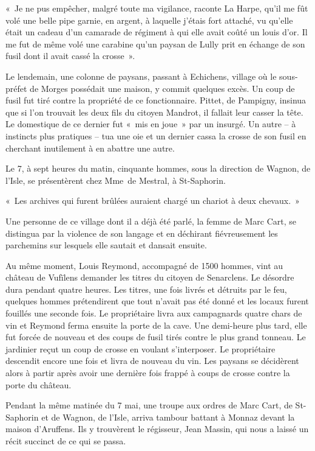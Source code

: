\documentclass[french,twoside]{book} %
\newenvironment{quoteblock}%
  {\begin{quoting}}
  {\end{quoting}}
\newenvironment{quotebar}{%
    \def\FrameCommand{{\color{rubric!10!}\vrule width 0.5em} \hspace{0.9em}}%
    \def\OuterFrameSep{\itemsep} %
    \MakeFramed {\advance\hsize-\width \FrameRestore}
  }%
  {%
    \endMakeFramed
  }
\renewenvironment{quoteblock}%
  {%
    \savenotes
    \setstretch{0.9}
    \normalfont
    \begin{quotebar}
  }
  {%
    \end{quotebar}
    \spewnotes
  }
\begin{document}
\begin{quoteblock}
 \noindent « Je ne pus empêcher, malgré toute ma vigilance, raconte La Harpe, qu’il me fût volé une belle pipe garnie, en argent, à laquelle j’étais fort attaché, vu qu’elle était un cadeau d’un camarade de régiment à qui elle avait coûté un louis d’or. Il me fut de même volé une carabine qu’un paysan de Lully prit en échange de son fusil dont il avait cassé la crosse ».
 \end{quoteblock}

\noindent Le lendemain, une colonne de paysans, passant à Echichens, village où le sous-préfet de Morges possédait une maison, y commit quelques excès. Un coup de fusil fut tiré contre la propriété de ce fonctionnaire. Pittet, de Pampigny, insinua que si l’on trouvait les deux fils du citoyen Mandrot, il fallait leur casser la tête. Le domestique de ce dernier fut « mis en joue » par un insurgé. Un autre – à instincts plus pratiques – tua une oie et un dernier cassa la crosse de son fusil en cherchant inutilement à en abattre une autre.\par
Le 7, à sept heures du matin, cinquante hommes, sous la direction de Wagnon, de l’Isle, se présentèrent chez Mme de Mestral, à St-Saphorin.\par

\begin{quoteblock}
\noindent « Les archives qui furent brûlées auraient chargé un chariot à deux chevaux. »\end{quoteblock}

\noindent Une personne de ce village dont il a déjà été parlé, la femme de Marc Cart, se distingua par la violence de son langage et en déchirant fiévreusement les parchemins sur lesquels elle sautait et dansait ensuite.\par
Au même moment, Louis Reymond, accompagné de 1500 hommes, vint au château de Vufïlens demander les titres du citoyen de Senarclens. Le désordre dura pendant quatre heures. Les titres, une fois livrés et détruits par le feu, quelques hommes prétendirent que tout n’avait pas été donné et les locaux furent fouillés une seconde fois. Le propriétaire livra aux campagnards quatre chars de vin et Reymond ferma ensuite la porte de la cave. Une demi-heure plus tard, elle fut forcée de nouveau et des coups de fusil tirés contre le plus grand tonneau. Le jardinier reçut un coup de crosse en voulant s’interposer. Le propriétaire descendit encore une fois et livra de nouveau du vin. Les paysans se décidèrent alors à partir après avoir une dernière fois frappé à coups de crosse contre la porte du château.\par
Pendant la même matinée du 7 mai, une troupe aux ordres de Marc Cart, de St-Saphorin et de Wagnon, de l’Isle, arriva tambour battant à Monnaz devant la maison d’Aruffens. Ils y trouvèrent le régisseur, Jean Massin, qui nous a laissé un récit succinct de ce qui se passa.\par
\end{document}
